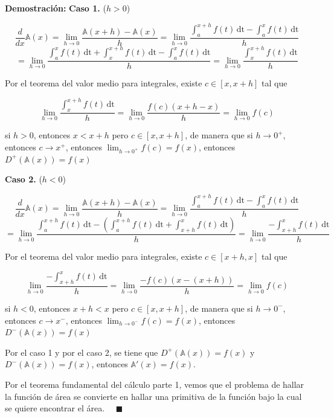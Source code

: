 \documentclass{article}
\numberwithin{equation}{section}
\newcommand{\Col}{\color{ProcessBlue}}
\newenvironment
{proof}
{\par\medskip\noindent\textbf{Demostración:}\rmfamily}
{\Col\hfill$\quad \blacksquare$\vspace{0.5cm}}
\begin{document}
\begin{proof}
    \textbf{Caso 1.} ($h>0$)

    $$ \frac{d}{dx}\mathbb{A}(x)=\lim_{h\to 0}\frac{\mathbb{A}(x+h)-\mathbb{A}(x)}{h}= \lim_{h\to 0}\frac{  \int_{a}^{x+h} \! {f(t)} \, \mathrm{dt} - \int_{a}^{x} \! {f(t)} \, \mathrm{dt} }{h}$$
    $$= \lim_{h\to 0}\frac{  \int_{a}^{x} \! {f(t)} \, \mathrm{dt} + \int_{x}^{x+h} \! {f(t)} \, \mathrm{dt} - \int_{a}^{x} \! {f(t)} \, \mathrm{dt} }{h}=\lim_{h\to 0} \frac{\int_{x}^{x+h} \! {f(t)} \, \mathrm{dt}}{h} $$

    Por el teorema del valor medio para integrales, existe $c\in [x,x+h]$ tal que 

    $$\lim_{h\to 0} \frac{\int_{x}^{x+h} \! {f(t)} \, \mathrm{dt}}{h}=\lim_{h\to 0}\frac{f(c)(x+h-x)}{h}=\lim_{h\to 0}f(c)$$

    si $h>0$, entonces $x<x+h$ pero $c\in [x,x+h]$, de manera que si $h\longrightarrow 0^+$, entonces $c\longrightarrow x^+$, entonces $\lim_{h\to 0^+}f(c)=f(x)$, entonces $D^+(\mathbb{A}(x))=f(x)$

    \vspace{1cm}

    \textbf{Caso 2.} ($h<0$)

    $$ \frac{d}{dx}\mathbb{A}(x)=\lim_{h\to 0}\frac{\mathbb{A}(x+h)-\mathbb{A}(x)}{h}= \lim_{h\to 0}\frac{  \int_{a}^{x+h} \! {f(t)} \, \mathrm{dt} - \int_{a}^{x} \! {f(t)} \, \mathrm{dt} }{h}$$
    $$= \lim_{h\to 0}\frac{  \int_{a}^{x+h} \! {f(t)} \, \mathrm{dt} -\left( \int_{a}^{x+h} \! {f(t)} \, \mathrm{dt} + \int_{x+h}^{x} \! {f(t)} \, \mathrm{dt} \right)}{h}=\lim_{h\to 0} \frac{-\int_{x+h}^{x} \! {f(t)} \, \mathrm{dt}}{h} $$

    Por el teorema del valor medio para integrales, existe $c\in [x+h,x]$ tal que 

    $$\lim_{h\to 0} \frac{-\int_{x+h}^{x} \! {f(t)} \, \mathrm{dt}}{h}=\lim_{h\to 0}\frac{-f(c)(x-(x+h))}{h}=\lim_{h\to 0}f(c)$$

    si $h<0$, entonces $x+h<x$ pero $c\in [x,x+h]$, de manera que si $h\longrightarrow 0^-$, entonces $c\longrightarrow x^-$, entonces $\lim_{h\to 0^-}f(c)=f(x)$, entonces $D^-(\mathbb{A}(x))=f(x)$

    Por el caso 1 y por el caso 2, se tiene que $D^+(\mathbb{A}(x))=f(x)$ y $D^-(\mathbb{A}(x))=f(x)$, entonces $\mathbb{A}'(x)=f(x)$.
    \vspace{0.3cm}
    \par Por el teorema fundamental del cálculo parte 1, vemos que el problema de hallar la función de área se convierte en hallar una primitiva de la función bajo la cual se quiere encontrar el área. 
\end{proof}
\end{document}
